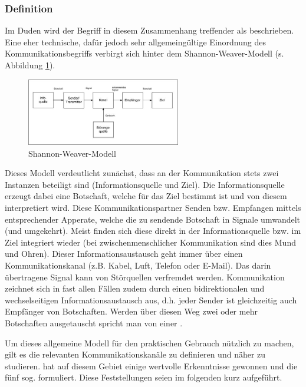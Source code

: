 \subsubsection{Definition}
Im Duden wird der Begriff in diesem Zusammenhang treffender  als  beschrieben.
Eine eher technische, dafür jedoch sehr allgemeingültige Einordnung des Kommunikationsbegriffs verbirgt sich hinter dem Shannon-Weaver-Modell (s. Abbildung \ref{fig:shannon-weaver-modell}).

\begin{figure}[htbp]
	\centering
	\includegraphics[width=0.6\textwidth]{abb/shannon-weaver-modell.jpg}
	\caption{Shannon-Weaver-Modell}
	\label{fig:shannon-weaver-modell}
\end{figure}

Dieses Modell verdeutlicht zunächst, dass an der Kommunikation stets zwei Instanzen beteiligt sind (Informationsquelle und Ziel).
Die Informationsquelle erzeugt dabei eine Botschaft, welche für das Ziel bestimmt ist und von diesem interpretiert wird.
Diese Kommunikationspartner Senden bzw. Empfangen mittels entsprechender Apperate, welche die zu sendende Botschaft in Signale umwandelt (und umgekehrt).
Meist finden sich diese  direkt in der Informationsquelle bzw. im Ziel integriert wieder (bei zwischenmenschlicher Kommunikation sind dies Mund und Ohren).
Dieser Informationsaustausch geht immer über einen Kommunikationskanal (z.B. Kabel, Luft, Telefon oder E-Mail). Das darin übertragene Signal kann von Störquellen verfremdet werden.
Kommunikation zeichnet sich in fast allen Fällen zudem durch einen bidirektionalen und wechselseitigen Informationsaustausch aus, d.h. jeder Sender ist gleichzeitig auch Empfänger von Botschaften.
Werden über diesen Weg zwei oder mehr Botschaften ausgetauscht spricht man von einer .
\citep{duden}
\citep{human-hacking}
\citep{grundlagen-der-kommunikation}

Um dieses allgemeine Modell für den praktischen Gebrauch nützlich zu machen, gilt es die relevanten Kommunikationskanäle zu definieren und näher zu studieren.
 hat auf diesem Gebiet einige wertvolle Erkenntnisse gewonnen und die fünf sog.  formuliert.
Diese Feststellungen seien im folgenden kurz aufgeführt.
\citep{grundlagen-der-kommunikation}

